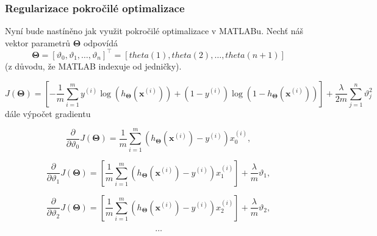 \subsubsection*{Regularizace pokročilé optimalizace}
\par{Nyní bude nastíněno jak využit pokročilé optimalizace v MATLABu. Nechť náš vektor parametrů $\bm{\Theta}$ odpovídá
\begin{equation}
	\bm{\Theta} = \left[ \vartheta_0 , \vartheta_1, \ldots , \vartheta_n \right]^{\top} = \left[ theta(1), theta(2), \ldots, theta(n + 1 ) \right]
\end{equation}
(z důvodu, že MATLAB indexuje od jedničky).

\begin{equation}
	J \left( \bm{\Theta} \right) = \left[ 
	- \frac{1}{m} \sum_{i = 1}^{m} y^{\left( i \right)} 
	\log \left( h_{\bm{\Theta}} \left( \bm{x}^{\left( i \right) } \right) \right)
	+ \left( 1 - y^{\left( i \right)} \right)
	\log \left( 1 - h_{\bm{\Theta}} \left( \bm{x}^{\left( i \right)} \right) \right) \right] + \frac{\lambda}{2m} \sum_{j = 1}^{n} \vartheta_j^2
\end{equation}
dále výpočet gradientu

\begin{equation}
	\frac{\partial}{\partial \vartheta_0} J \left( \bm{\Theta} \right) = \frac{1}{m} \sum_{i = 1}^{m} \left( h_{\bm{\Theta}} \left( \bm{x}^{\left( i \right)} \right) - y^{\left( i \right)} \right) x_0^{\left( i \right)},
\end{equation}

\begin{equation}
	\frac{\partial}{\partial \vartheta_1} J \left( \bm{\Theta} \right) = \left[ \frac{1}{m} \sum_{i = 1}^{m} \left( h_{\bm{\Theta}} \left( \bm{x}^{\left( i \right)} \right) - y^{\left( i \right)} \right) x_1^{\left( i \right)} \right] + \frac{\lambda}{m} \vartheta_1,
\end{equation}

\begin{equation}
	\frac{\partial}{\partial \vartheta_2} J \left( \bm{\Theta} \right) = \left[ \frac{1}{m} \sum_{i = 1}^{m} \left( h_{\bm{\Theta}} \left( \bm{x}^{\left( i \right)} \right) - y^{\left( i \right)} \right) x_2^{\left( i \right)} \right] + \frac{\lambda}{m} \vartheta_2,
\end{equation}

\begin{equation}
	\ldots
\end{equation}}






\newpage





















